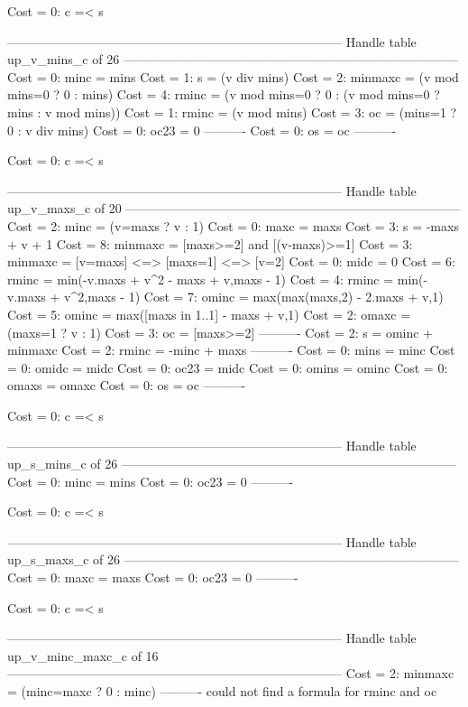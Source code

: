 Cost =  0:  c =< s

--------------------------------------------------------------------------------
Handle table up_v_mins_c of 26
--------------------------------------------------------------------------------
Cost =  0:  minc    = mins
Cost =  1:  s       = (v div mins)
Cost =  2:  minmaxc = (v mod mins=0 ? 0 : mins)
Cost =  4:  rminc   = (v mod mins=0 ? 0 : (v mod mins=0 ? mins : v mod mins))
Cost =  1:  rminc   = (v mod mins)
Cost =  3:  oc      = (mins=1 ? 0 : v div mins)
Cost =  0:  oc23    = 0
----------
Cost =  0:  os      = oc
----------

Cost =  0:  c =< s

--------------------------------------------------------------------------------
Handle table up_v_maxs_c of 20
--------------------------------------------------------------------------------
Cost =  2:  minc    = (v=maxs ? v : 1)
Cost =  0:  maxc    = maxs
Cost =  3:  s       = -maxs + v + 1
Cost =  8:  minmaxc = [maxs>=2] and [(v-maxs)>=1]
Cost =  3:  minmaxc = [v=maxs] <=> [maxs=1] <=> [v=2]
Cost =  0:  midc    = 0
Cost =  6:  rminc   = min(-v.maxs + v^2 - maxs + v,maxs - 1)
Cost =  4:  rminc   = min(-v.maxs + v^2,maxs - 1)
Cost =  7:  ominc   = max(max(maxs,2) - 2.maxs + v,1)
Cost =  5:  ominc   = max([maxs in 1..1] - maxs + v,1)
Cost =  2:  omaxc   = (maxs=1 ? v : 1)
Cost =  3:  oc      = [maxs>=2]
----------
Cost =  2:  s       = ominc + minmaxc
Cost =  2:  rminc   = -minc + maxs
----------
Cost =  0:  mins    = minc
Cost =  0:  omidc   = midc
Cost =  0:  oc23    = midc
Cost =  0:  omins   = ominc
Cost =  0:  omaxs   = omaxc
Cost =  0:  os      = oc
----------

Cost =  0:  c =< s

--------------------------------------------------------------------------------
Handle table up_s_mins_c of 26
--------------------------------------------------------------------------------
Cost =  0:  minc = mins
Cost =  0:  oc23 = 0
----------

Cost =  0:  c =< s

--------------------------------------------------------------------------------
Handle table up_s_maxs_c of 26
--------------------------------------------------------------------------------
Cost =  0:  maxc = maxs
Cost =  0:  oc23 = 0
----------

Cost =  0:  c =< s

--------------------------------------------------------------------------------
Handle table up_v_minc_maxc_c of 16
--------------------------------------------------------------------------------
Cost =  2:  minmaxc = (minc=maxc ? 0 : minc)
----------
could not find a formula for rminc and oc

